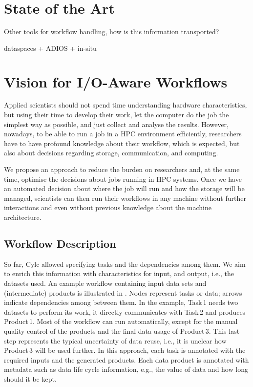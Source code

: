 \documentclass[a4paper]{article}
\newcommand{\jk}[1]{\todo[inline]{JK: #1}}
\begin{document}
\section{State of the Art}

Other tools for workflow handling, how is this information transported?

dataspaces + ADIOS + in-situ

\jk{TODO}


\section{Vision for I/O-Aware Workflows}

Applied scientists should not spend time understanding hardware characteristics, but using their time to develop their work, let the computer do the job the simplest way as possible, and just collect and analyse the results.
However, nowadays, to be able to run a job in a HPC environment efficiently, researchers have to have profound knowledge about their workflow, which is expected, but also about decisions regarding storage, communication, and computing.

We propose an approach to reduce the burden on researchers and, at the same time, optimise the decisions about jobs running in HPC systems.
Once we have an automated decision about where the job will run and how the storage will be managed, scientists can then run their workflows in any machine without further interactions and even without previous knowledge about the machine architecture.


\subsection{Workflow Description}

So far, Cylc allowed specifying tasks and the dependencies among them.
We aim to enrich this information with characteristics for input, and output, i.e., the datasets used.
An example workflow containing input data sets and (intermediate) products is illustrated in .
Nodes represent tasks or data; arrows indicate dependencies among between them.
In the example, Task\,1 needs two datasets to perform its work, it directly communicates with Task\,2 and produces Product\,1.
Most of the workflow can run automatically, except for the manual quality control of the products and the final data usage of Product\,3.
This last step represents the typical uncertainty of data reuse, i.e., it is unclear how Product\,3 will be used further.
In this approach, each task is annotated with the required inputs and the generated products.
Each data product is annotated with metadata such as data life cycle information, e.g., the value of data and how long should it be kept.
\end{document}
